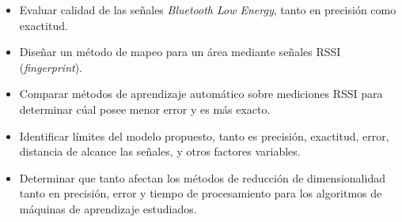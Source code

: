 \begin{itemize}
\item Evaluar calidad de las señales \textit{Bluetooth Low Energy}, tanto en precisión como exactitud.

\item Diseñar un método de mapeo para un área mediante señales RSSI (\textit{fingerprint}).

\item Comparar métodos de aprendizaje automático sobre mediciones RSSI para determinar cúal posee menor error y es más exacto.

\item Identificar límites del modelo propuesto, tanto es precisión, exactitud, error, distancia de alcance las señales, y otros factores variables.

\item Determinar que tanto afectan los métodos de reducción de dimensionalidad tanto en precisión, error y tiempo de procesamiento para los algoritmos de máquinas de aprendizaje estudiados.

\end{itemize}